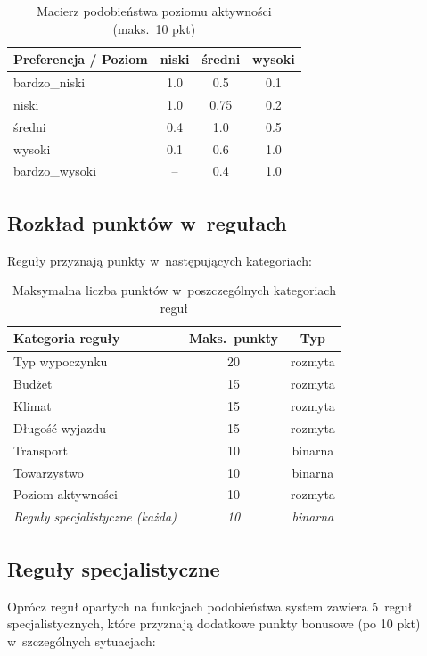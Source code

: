 \documentclass[12pt,a4paper]{article}
\begin{document}
\begin{table}[H]
\centering
\begin{tabular}{l|ccc}
\toprule
\textbf{Preferencja / Poziom} & \textbf{niski} & \textbf{średni} & \textbf{wysoki} \\
\midrule
bardzo\_niski & 1.0 & 0.5 & 0.1 \\
niski & 1.0 & 0.75 & 0.2 \\
średni & 0.4 & 1.0 & 0.5 \\
wysoki & 0.1 & 0.6 & 1.0 \\
bardzo\_wysoki & -- & 0.4 & 1.0 \\
\bottomrule
\end{tabular}
\caption{Macierz podobieństwa poziomu aktywności (maks.\ 10 pkt)}
\end{table}

\subsection{Rozkład punktów w~regułach}

Reguły przyznają punkty w~następujących kategoriach:

\begin{table}[H]
\centering
\begin{tabular}{lcc}
\toprule
\textbf{Kategoria reguły} & \textbf{Maks.\ punkty} & \textbf{Typ} \\
\midrule
Typ wypoczynku & 20 & rozmyta \\
Budżet & 15 & rozmyta \\
Klimat & 15 & rozmyta \\
Długość wyjazdu & 15 & rozmyta \\
Transport & 10 & binarna \\
Towarzystwo & 10 & binarna \\
Poziom aktywności & 10 & rozmyta \\
\midrule
\textit{Reguły specjalistyczne (każda)} & \textit{10} & \textit{binarna} \\
\bottomrule
\end{tabular}
\caption{Maksymalna liczba punktów w~poszczególnych kategoriach reguł}
\end{table}

\subsection{Reguły specjalistyczne}

Oprócz reguł opartych na funkcjach podobieństwa system zawiera 5~reguł specjalistycznych, które przyznają dodatkowe punkty bonusowe (po 10 pkt) w~szczególnych sytuacjach:
\end{document}
